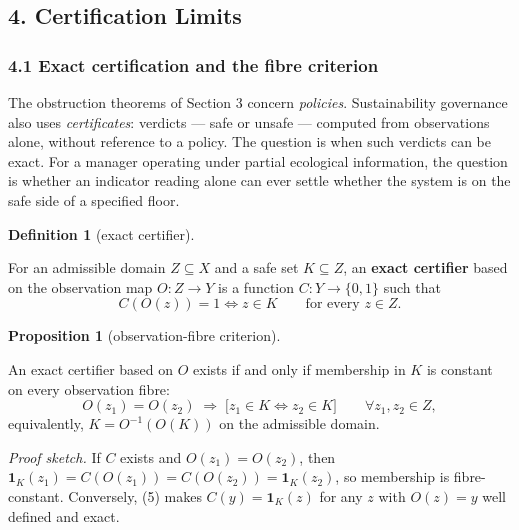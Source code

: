 \documentclass[10pt,twocolumn]{article}
\theoremstyle{definition}
\newtheorem{proposition}{Proposition}
\newtheorem{definition}{Definition}
\begin{document}
\subsection{4. Certification Limits}\label{certification-limits}

\subsubsection{4.1 Exact certification and the fibre
criterion}\label{exact-certification-and-the-fibre-criterion}

The obstruction theorems of Section 3 concern \emph{policies}.
Sustainability governance also uses \emph{certificates}: verdicts
--- safe or unsafe --- computed from observations alone, without
reference to a policy. The question is when such verdicts can be exact.
For a manager operating under partial ecological information, the question is whether an indicator reading alone can ever settle whether the system is on the safe side of a specified floor.

\begin{definition}[exact certifier]\label{def:certifier}

For an admissible domain
\(Z \subseteq X\) and a safe set \(K \subseteq Z\), an \textbf{exact
certifier} based on the observation map \(O : Z \to Y\) is a function
\(C : Y \to \{0,1\}\) such that
\[C(O(z)) = 1 \iff z \in K \qquad \text{for every } z \in Z.\]

\end{definition}

\begin{proposition}[observation-fibre criterion]\label{prop:fibre}

An exact certifier
based on \(O\) exists if and only if membership in \(K\) is constant on
every observation fibre:
\[O(z_1) = O(z_2) \;\Longrightarrow\; \big[ z_1 \in K \iff z_2 \in K \big] \qquad \forall z_1, z_2 \in Z, \tag{5}\]
equivalently, \(K = O^{-1}(O(K))\) on the admissible domain.

\end{proposition}

\emph{Proof sketch.} If \(C\) exists and \(O(z_1) = O(z_2)\), then \(\mathbf{1}_K(z_1) = C(O(z_1)) = C(O(z_2)) = \mathbf{1}_K(z_2)\), so membership is fibre-constant. Conversely, (5) makes \(C(y) = \mathbf{1}_K(z)\) for any \(z\) with \(O(z) = y\) well defined and exact.
\end{document}
